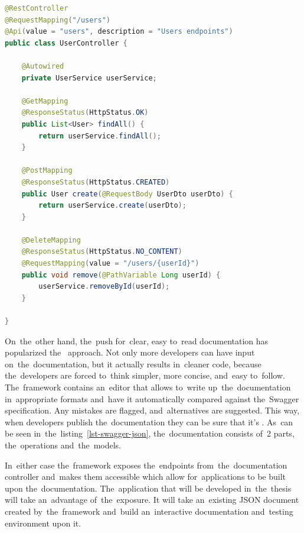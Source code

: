 \vspace{1mm}
\begin{lstlisting}[caption=An~example of~Spring controller with Swagger's
annotations that can be used to~generate API documentation., style=dp-default,
language=Java, label=lst-swagger-api]
@RestController
@RequestMapping("/users")
@Api(value = "users", description = "Users endpoints")
public class UserController {

	@Autowired
	private UserService userService;
	
	@GetMapping
	@ResponseStatus(HttpStatus.OK)
	public List<User> findAll() {
		return userService.findAll();
	}
	
	@PostMapping
	@ResponseStatus(HttpStatus.CREATED)
	public User create(@RequestBody UserDto userDto) {
		return userService.create(userDto);
	}
	
	@DeleteMapping
	@ResponseStatus(HttpStatus.NO_CONTENT)
	@RequestMapping(value = "/users/{userId}")
	public void remove(@PathVariable Long userId) {
		userService.removeById(userId);
	}

}
\end{lstlisting}

On~the~other hand, the~push for~clear, easy to~read documentation has
popularized the~ approach. Not only more developers can have
input on~the~documentation, but it actually results in~cleaner code, because
the~developers are forced to~think simpler, more concise, and~easy to~follow.
The~framework contains an~editor that allows to~write up~the~documentation
in~appropriate formats and~have it automatically compared against the~Swagger
specification. Any mistakes are flagged, and~alternatives are suggested. This
way, when developers publish the~documentation they can be sure that it's
. As~can be seen in~the~listing~\ref{lst-swagger-json},
the~documentation consists of~2 parts, the~operations and~the~models.

In~either case the~framework exposes the~endpoints from~the~documentation
controller and~makes them accessible which allow for~applications to be built
upon the~documentation. The~application that will be developed in~the~thesis
will take an~advantage of~the~exposure. It will take an~existing JSON document
created by~the~framework and~build an~interactive documentation and~testing
environment upon it.

